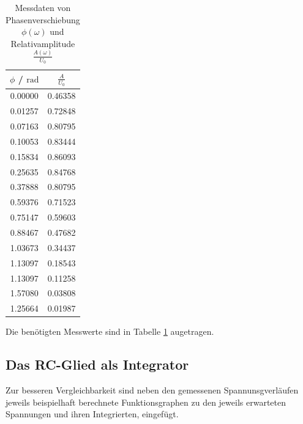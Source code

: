 \begin{table}
	\caption{Messdaten von Phasenverschiebung $\phi(\omega)$ und Relativamplitude $\frac{A(\omega)}{U_0}$}
	\centering
	\label{tab:polars}
	\begin{tabular}{cc}
		\toprule
		$\phi$ / $\si{\radian}$ & $\frac{A}{U_0}$ \\
		\midrule
		0.00000                 & 0.46358         \\
		0.01257                 & 0.72848         \\
		0.07163                 & 0.80795         \\
		0.10053                 & 0.83444         \\
		0.15834                 & 0.86093         \\
		0.25635                 & 0.84768         \\
		0.37888                 & 0.80795         \\
		0.59376                 & 0.71523         \\
		0.75147                 & 0.59603         \\
		0.88467                 & 0.47682         \\
		1.03673                 & 0.34437         \\
		1.13097                 & 0.18543         \\
		1.13097                 & 0.11258         \\
		1.57080                 & 0.03808         \\
		1.25664                 & 0.01987         \\
		\bottomrule
	\end{tabular}
\end{table}

Die benötigten Messwerte sind in Tabelle \ref{tab:polars} augetragen.
\subsection{Das RC-Glied als Integrator}
Zur besseren Vergleichbarkeit sind neben den gemessenen Spannunsgverläufen jeweils beispielhaft berechnete Funktionsgraphen zu den jeweils erwarteten Spannungen und ihren Integrierten, eingefügt.

